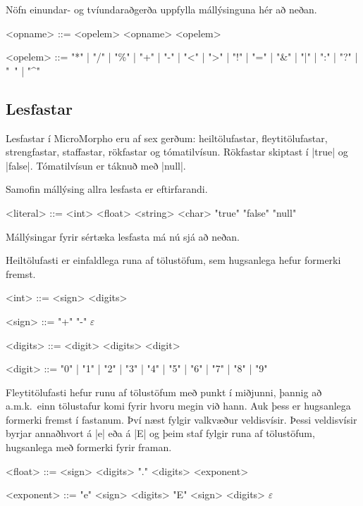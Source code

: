 \documentclass[12pt]{article}
\makeatletter
\newenvironment{bnf}[2]{%
    \setlength{\grammarindent}{\widthof{\synt{#2}::=} + 0.85em}
    \def\@grammarname{#1}
    \begin{grammarfloat}[H]
    \begin{mdframed}[style=langframe]
    \vspace{-\grammarparsep}
    \begin{grammar}
}{%
    \end{grammar}
    \end{mdframed}
    \vspace{-10pt}
    \caption{\@grammarname}
    \end{grammarfloat}
    \setlength{\grammarindent}{2em}
}
\renewcommand*{\empty}{\ensuremath{\varepsilon}}
\makeatother
\begin{document}
Nöfn einundar- og tvíundaraðgerða uppfylla mállýsinguna hér að neðan.

\begin{bnf}{Aðgerðanöfn}{opname}
    <opname> ::= <opelem> <opname>
            \alt <opelem>

    <opelem> ::= "*" | "/" | "\%" | "+" | "-" | "<" | ">" | "!" | "=" | "&" | "|" | ":" | "?" | "~" | "^" 
\end{bnf}

\subsection{Lesfastar}
Lesfastar í MicroMorpho eru af sex gerðum:
heiltölufastar, fleytitölufastar, strengfastar, staffastar,
rökfastar og tómatilvísun.
Rökfastar skiptast í |true| og |false|.
Tómatilvísun er táknuð með |null|.

Samofin mállýsing allra lesfasta er eftirfarandi.

\begin{bnf}{Lesfastar}{literal}
    <literal> ::= <int>
             \alt <float>
             \alt <string>
             \alt <char>
             \alt "true"
             \alt "false"
             \alt "null"
\end{bnf}

Mállýsingar fyrir sértæka lesfasta má nú sjá að neðan.

Heiltölufasti er einfaldlega runa af tölustöfum,
sem hugsanlega hefur formerki fremst.

\begin{bnf}{Heiltölufastar}{minus}
    <int> ::= <sign> <digits>

    <sign> ::= "+"
          \alt "-"
          \alt \empty

    <digits> ::= <digit> <digits>
            \alt <digit>

    <digit> ::= "0" | "1" | "2" | "3" | "4" | "5" | "6" | "7" | "8" | "9"
\end{bnf}

Fleytitölufasti hefur runu af tölustöfum
með punkt í miðjunni, þannig að a.m.k.~einn tölustafur komi fyrir
hvoru megin við hann.
Auk þess er hugsanlega formerki fremst í fastanum.
Því næst fylgir valkvæður veldisvísir.
Þessi veldisvísir byrjar annaðhvort á |e| eða á |E|
og þeim staf fylgir runa af tölustöfum, hugsanlega með
formerki fyrir framan.

\begin{bnf}{Fleytitölufastar}{exponent}
    <float> ::= <sign> <digits> "." <digits> <exponent>

    <exponent> ::= "e" <sign> <digits>
              \alt "E" <sign> <digits>
              \alt \empty

\end{bnf}
\end{document}
